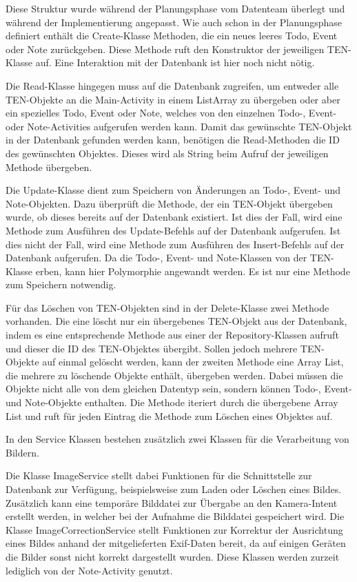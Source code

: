 Diese Struktur wurde während der Planungsphase vom Datenteam überlegt und während der Implementierung angepasst. Wie auch schon in der Planungsphase definiert enthält die Create-Klasse Methoden, die ein neues leeres Todo, Event oder Note zurückgeben. Diese Methode ruft den Konstruktor der jeweiligen TEN-Klasse auf. Eine Interaktion mit der Datenbank ist hier noch nicht nötig.

Die Read-Klasse hingegen muss auf die Datenbank zugreifen, um entweder alle TEN-Objekte an die Main-Activity in einem ListArray zu übergeben oder aber ein spezielles Todo, Event oder Note, welches von den einzelnen Todo-, Event- oder Note-Activities aufgerufen werden kann. Damit das gewünschte TEN-Objekt in der Datenbank gefunden werden kann, benötigen die Read-Methoden die ID des gewünschten Objektes. Dieses wird als String beim Aufruf der jeweiligen Methode übergeben.

Die Update-Klasse dient zum Speichern von Änderungen an Todo-, Event- und Note-Objekten. Dazu überprüft die Methode, der ein TEN-Objekt übergeben wurde, ob dieses bereits auf der Datenbank existiert. Ist dies der Fall, wird eine Methode zum Ausführen des Update-Befehls auf der Datenbank aufgerufen. Ist dies nicht der Fall, wird eine Methode zum Ausführen des Insert-Befehls auf der Datenbank aufgerufen. Da die Todo-, Event- und Note-Klassen von der TEN-Klasse erben, kann hier Polymorphie angewandt werden. Es ist nur eine Methode zum Speichern notwendig.

Für das Löschen von TEN-Objekten sind in der Delete-Klasse zwei Methode vorhanden. Die eine löscht nur ein übergebenes TEN-Objekt aus der Datenbank, indem es eine entsprechende Methode aus einer der Repository-Klassen aufruft und dieser die ID des TEN-Objektes übergibt. Sollen jedoch mehrere TEN-Objekte auf einmal gelöscht werden, kann der zweiten Methode eine Array List, die mehrere zu löschende Objekte enthält, übergeben werden. Dabei müssen die Objekte nicht alle von dem gleichen Datentyp sein, sondern können Todo-, Event- und Note-Objekte enthalten. Die Methode iteriert durch die übergebene Array List und ruft für jeden Eintrag die Methode zum Löschen eines Objektes auf.

In den Service Klassen bestehen zusätzlich zwei Klassen für die Verarbeitung von Bildern.

Die Klasse ImageService stellt dabei Funktionen für die Schnittstelle zur Datenbank zur Verfügung, beispielsweise zum Laden oder Löschen eines Bildes. Zusätzlich kann eine temporäre Bilddatei zur Übergabe an den Kamera-Intent erstellt werden, in welcher bei der Aufnahme die Bilddatei gespeichert wird. Die Klasse ImageCorrectionService stellt Funktionen zur Korrektur der Ausrichtung eines Bildes anhand der mitgelieferten Exif-Daten bereit, da auf einigen Geräten die Bilder sonst nicht korrekt dargestellt wurden. Diese Klassen werden zurzeit lediglich von der Note-Activity genutzt.

